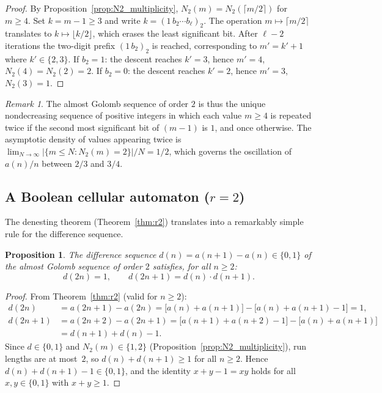 \documentclass[12pt]{article}
\newtheorem{proposition}[theorem]{Proposition}
\theoremstyle{definition}
\theoremstyle{remark}
\newtheorem{remark}[theorem]{Remark}
\begin{document}
\begin{proof}
By Proposition~\ref{prop:N2_multiplicity},
$N_2(m)=N_2(\lceil m/2\rceil)$ for $m\ge 4$.
Set $k=m-1\ge 3$ and write $k=(1\,b_2\cdots b_\ell)_2$.
The operation $m\mapsto\lceil m/2\rceil$ translates to
$k\mapsto\lfloor k/2\rfloor$, which erases the least significant bit.
After $\ell-2$ iterations the two-digit prefix
$(1\,b_2)_2$ is reached, corresponding to
$m'=k'+1$ where $k'\in\{2,3\}$.
If $b_2=1$: the descent reaches $k'=3$, hence $m'=4$, $N_2(4)=N_2(2)=2$.
If $b_2=0$: the descent reaches $k'=2$, hence $m'=3$, $N_2(3)=1$.
\end{proof}

\begin{remark}
The almost Golomb sequence of order $2$ is thus the unique nondecreasing
sequence of positive integers in which each value $m\ge 4$ is repeated
twice if the second most significant bit of $(m-1)$ is $1$, and once otherwise.
The asymptotic density of values appearing twice is
$\lim_{N\to\infty}|\{m\le N:N_2(m)=2\}|/N=1/2$,
which governs the oscillation of $a(n)/n$ between $2/3$ and $3/4$.
\end{remark}

\subsection{A Boolean cellular automaton ($r=2$)}

The denesting theorem (Theorem~\ref{thm:r2}) translates into a
remarkably simple rule for the difference sequence.

\begin{proposition}\label{prop:AND-automaton}
The difference sequence $d(n)=a(n+1)-a(n)\in\{0,1\}$ of the almost
Golomb sequence of order $2$ satisfies, for all $n\ge 2$:
\begin{equation}\label{eq:AND}
  d(2n)=1,\qquad d(2n+1)=d(n)\cdot d(n+1).
\end{equation}
\end{proposition}

\begin{proof}
From Theorem~\ref{thm:r2} (valid for $n\ge 2$):
\begin{align*}
  d(2n) &= a(2n+1)-a(2n) = \bigl[a(n)+a(n+1)\bigr]-\bigl[a(n)+a(n+1)-1\bigr]=1,\\
  d(2n+1) &= a(2n+2)-a(2n+1)
           = \bigl[a(n+1)+a(n+2)-1\bigr]-\bigl[a(n)+a(n+1)\bigr]\\
           &= d(n+1)+d(n)-1.
\end{align*}
Since $d\in\{0,1\}$ and $N_2(m)\in\{1,2\}$
(Proposition~\ref{prop:N2_multiplicity}), run lengths are at most~$2$,
so $d(n)+d(n+1)\ge 1$ for all $n\ge 2$.
Hence $d(n)+d(n+1)-1\in\{0,1\}$, and the identity
$x+y-1=xy$ holds for all $x,y\in\{0,1\}$ with $x+y\ge 1$.
\end{proof}
\end{document}
